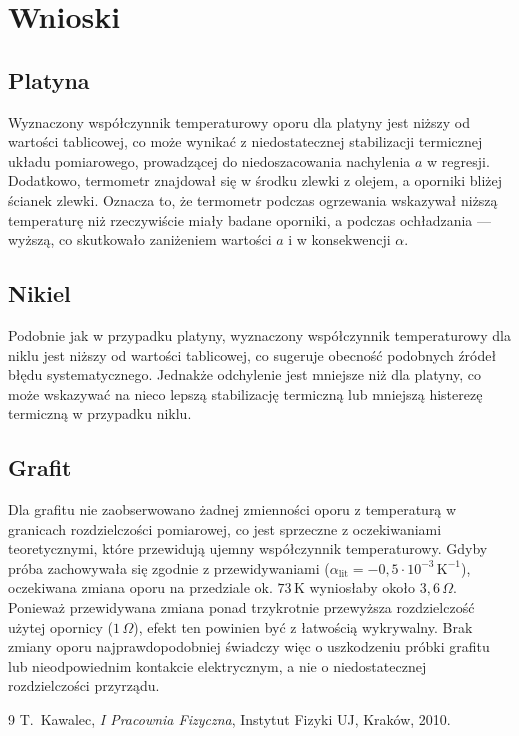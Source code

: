 \documentclass[12pt, a4paper]{article}
\begin{document}
\section{Wnioski}
\subsection{Platyna}
Wyznaczony współczynnik temperaturowy oporu dla platyny jest niższy od wartości tablicowej, co może wynikać z niedostatecznej stabilizacji termicznej układu pomiarowego, prowadzącej do niedoszacowania nachylenia $a$ w regresji. Dodatkowo, termometr znajdował się w środku zlewki z olejem, a oporniki bliżej ścianek zlewki. Oznacza to, że termometr podczas ogrzewania wskazywał niższą temperaturę niż rzeczywiście miały badane oporniki, a podczas ochładzania --- wyższą, co skutkowało zaniżeniem wartości $a$ i w konsekwencji $\alpha$.

\subsection{Nikiel}
Podobnie jak w przypadku platyny, wyznaczony współczynnik temperaturowy dla niklu jest niższy od wartości tablicowej, co sugeruje obecność podobnych źródeł błędu systematycznego. Jednakże odchylenie jest mniejsze niż dla platyny, co może wskazywać na nieco lepszą stabilizację termiczną lub mniejszą histerezę termiczną w przypadku niklu.

\subsection{Grafit}
Dla grafitu nie zaobserwowano żadnej zmienności oporu z temperaturą w granicach rozdzielczości pomiarowej, co jest sprzeczne z oczekiwaniami teoretycznymi, które przewidują ujemny współczynnik temperaturowy. Gdyby próba zachowywała się zgodnie z przewidywaniami ($\alpha_{\mathrm{lit}} = -0,5 \cdot 10^{-3}\,\mathrm{K}^{-1}$), oczekiwana zmiana oporu na przedziale ok. $73\,\mathrm{K}$ wyniosłaby około $3,6\,\Omega$. Ponieważ przewidywana zmiana ponad trzykrotnie przewyższa rozdzielczość użytej opornicy ($1\,\Omega$), efekt ten powinien być z łatwością wykrywalny. Brak zmiany oporu najprawdopodobniej świadczy więc o uszkodzeniu próbki grafitu lub nieodpowiednim kontakcie elektrycznym, a nie o niedostatecznej rozdzielczości przyrządu.


\begin{thebibliography}{9}
        T.~Kawalec,
        \textit{I Pracownia Fizyczna},
        Instytut Fizyki UJ, Kraków, 2010.
\end{thebibliography}
\end{document}
